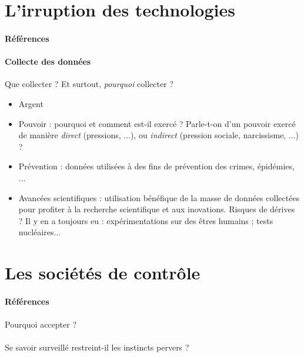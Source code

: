 \section{L'irruption des technologies}
\paragraph{Références} \cite{Damasio:0} \cite{Marx:1} \cite{TechnoSocio:0} \cite{GhostInTheShell}

\paragraph{Collecte des données} Que collecter ? Et surtout, \emph{pourquoi} collecter ?
\begin{itemize}
    \item Argent
    \item Pouvoir : pourquoi et comment est-il exercé ? Parle-t-on d'un pouvoir exercé de
    manière \emph{direct} (pressions, ...), ou \emph{indirect} (pression sociale,
    narcissisme, ...) ?
    \item Prévention : données utilisées à des fins de prévention des crimes, épidémies, ...
    \item Avancées scientifiques : utilisation bénéfique de la masse de données collectées
    pour profiter à la recherche scientifique et aux inovations. Risques de dérives ? Il y
    en a toujours eu : expérimentations sur des êtres humains ; tests nucléaires... 
\end{itemize}


\section{Les sociétés de contrôle}
\paragraph{Références} \cite{Huxley:0} \cite{Orwell:0} \cite{TechnoSocio:1}
\paragraph{} Pourquoi accepter ?
\paragraph{} Se savoir surveillé restreint-il les instincts pervers ?